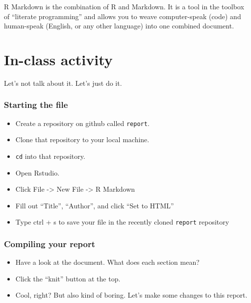 \documentclass[
]{book}
\providecommand{\tightlist}{%
  \setlength{\itemsep}{0pt}\setlength{\parskip}{0pt}}
\begin{document}
R Markdown is the combination of R and Markdown. It is a tool in the toolbox of ``literate programming'' and allows you to weave computer-speak (code) and human-speak (English, or any other language) into one combined document.

\hypertarget{in-class-activity}{%
\section*{In-class activity}\label{in-class-activity}}

Let's not talk about it. Let's just do it.

\hypertarget{starting-the-file}{%
\subsubsection*{Starting the file}\label{starting-the-file}}

\begin{itemize}
\tightlist
\item
  Create a repository on github called \texttt{report}.\\
\item
  Clone that repository to your local machine.\\
\item
  \texttt{cd} into that repository.\\
\item
  Open Rstudio.\\
\item
  Click File -\textgreater{} New File -\textgreater{} R Markdown\\
\item
  Fill out ``Title'', ``Author'', and click ``Set to HTML''\\
\item
  Type ctrl + s to save your file in the recently cloned \texttt{report} repository
\end{itemize}

\hypertarget{compiling-your-report}{%
\subsubsection*{Compiling your report}\label{compiling-your-report}}

\begin{itemize}
\tightlist
\item
  Have a look at the document. What does each section mean?\\
\item
  Click the ``knit'' button at the top.\\
\item
  Cool, right? But also kind of boring. Let's make some changes to this report.
\end{itemize}
\end{document}
